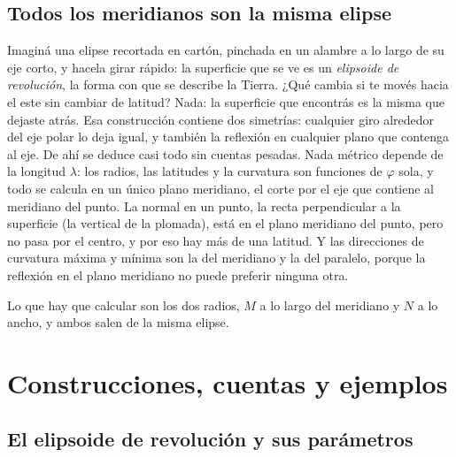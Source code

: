 \subsection{Todos los meridianos son la misma elipse}

Imaginá una elipse recortada en cartón, pinchada en un alambre a lo largo de su eje corto, y
hacela girar rápido: la superficie que se ve es un \emph{elipsoide de revolución}, la forma con
que se describe la Tierra. ¿Qué cambia si te movés hacia el este sin cambiar de latitud? Nada:
la superficie que encontrás es la misma que dejaste atrás.
Esa construcción contiene dos simetrías: cualquier giro alrededor del eje polar lo deja igual,
y también la reflexión en cualquier plano que contenga al eje. De ahí se deduce casi todo sin
cuentas pesadas. Nada métrico depende de la longitud \(\lambda\): los radios, las latitudes y
la curvatura son funciones de \(\varphi\) sola, y todo se calcula en un único plano meridiano,
el corte por el eje que contiene al meridiano del punto.
La normal en un punto, la recta perpendicular a la superficie (la vertical de la plomada),
está en el plano meridiano del punto, pero no pasa por el centro, y por
eso hay más de una latitud. Y las direcciones de curvatura máxima y mínima son la del
meridiano y la del paralelo, porque la reflexión en el plano meridiano no puede preferir
ninguna otra.

\begin{idea}
Lo que hay que calcular son los dos radios, \(M\) a lo largo del meridiano y \(N\) a lo ancho,
y ambos salen de la misma elipse.
\end{idea}


\section{Construcciones, cuentas y ejemplos}

\subsection{El elipsoide de revolución y sus parámetros}

